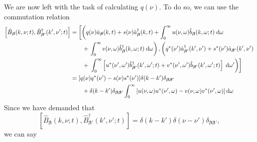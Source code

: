 We are now left with the task of calculating $q(\nu)$. To do so, we can use the commutation relation
\begin{equation}
\begin{split}
\left[\hat{B}_{\bm{\beta}}(k,\nu;t),\hat{B}_{\bm{\beta}'}^\dagger(k',\nu';t)\right] &= \left[\left(q(\nu)\hat{a}_{\bm{\beta}}(k,t) + s(\nu)\hat{a}_{\bm{\beta}}^\dagger(k,t) + \int_0^\infty u(\nu,\omega)\hat{b}_{\bm{\beta}}(k,\omega;t)\;\mathrm{d}\omega\right.\right.\\
&\qquad + \left. \int_0^\infty v(\nu,\omega)\hat{b}_{\bm{\beta}}^\dagger(k,\omega;t)\;\mathrm{d}\omega \right),\left(q^*(\nu')\hat{a}_{\bm{\beta}'}^\dagger(k',\nu') + s^*(\nu')\hat{a}_{\bm{\beta}'}(k',\nu')  \vphantom{\int_0^\infty}\right.\\
&\qquad + \left.\left.\int_0^\infty\left[u^*(\nu',\omega')\hat{b}_{\bm{\beta}'}^\dagger(k',\omega';t) + v^*(\nu',\omega')\hat{b}_{\bm{\beta}'}(k',\omega';t)\right]\;\mathrm{d}\omega'\right)\right]\\
&= [q(\nu)q^*(\nu') - s(\nu)s^*(\nu')]\delta(k - k')\delta_{\bm{\beta}\bm{\beta}'}\\
&\qquad + \delta(k - k')\delta_{\bm{\beta}\bm{\beta}'}\int_0^\infty\left[u(\nu,\omega)u^*(\nu',\omega) - v(\nu,\omega)v^*(\nu',\omega)\right]\mathrm{d}\omega
\end{split}
\end{equation}
Since we have demanded that
\begin{equation}
\left[\hat{B}_{\bm{\beta}}(k,\nu;t),\hat{B}_{\bm{\beta}'}^\dagger(k',\nu';t)\right] = \delta(k - k')\delta(\nu - \nu')\delta_{\bm{\beta}\bm{\beta}'},
\end{equation}
we can say
